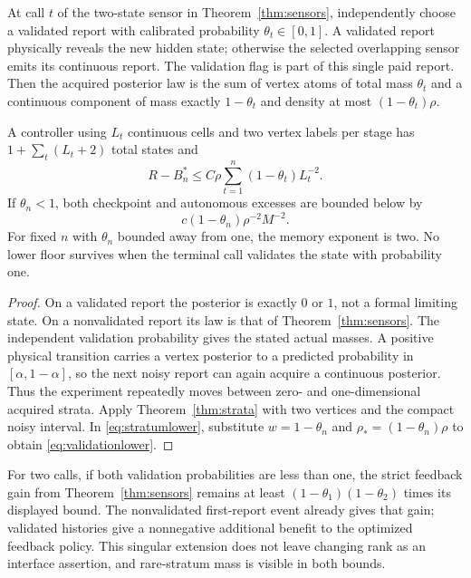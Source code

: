 \begin{corollary}\label{cor:validation}
At call $t$ of the two-state sensor in Theorem~\ref{thm:sensors}, independently choose a validated report with calibrated probability $\theta_t\in[0,1]$. A validated report physically reveals the new hidden state; otherwise the selected overlapping sensor emits its continuous report. The validation flag is part of this single paid report. Then the acquired posterior law is the sum of vertex atoms of total mass $\theta_t$ and a continuous component of mass exactly $1-\theta_t$ and density at most $(1-\theta_t)\rho$.

A controller using $L_t$ continuous cells and two vertex labels per stage has $1+\sum_t(L_t+2)$ total states and
\begin{equation}\label{eq:validationupper}
 R-B_n^*\le C\rho\sum_{t=1}^n(1-\theta_t)L_t^{-2}.
\end{equation}
If $\theta_n<1$, both checkpoint and autonomous excesses are bounded below by
\begin{equation}\label{eq:validationlower}
 c(1-\theta_n)\rho^{-2}M^{-2}.
\end{equation}
For fixed $n$ with $\theta_n$ bounded away from one, the memory exponent is two. No lower floor survives when the terminal call validates the state with probability one.
\end{corollary}
\begin{proof}
On a validated report the posterior is exactly $0$ or $1$, not a formal limiting state. On a nonvalidated report its law is that of Theorem~\ref{thm:sensors}. The independent validation probability gives the stated actual masses. A positive physical transition carries a vertex posterior to a predicted probability in $[\alpha,1-\alpha]$, so the next noisy report can again acquire a continuous posterior. Thus the experiment repeatedly moves between zero- and one-dimensional acquired strata. Apply Theorem~\ref{thm:strata} with two vertices and the compact noisy interval. In \eqref{eq:stratumlower}, substitute $w=1-\theta_n$ and $\rho_*=(1-\theta_n)\rho$ to obtain \eqref{eq:validationlower}.
\end{proof}
For two calls, if both validation probabilities are less than one, the strict feedback gain from Theorem~\ref{thm:sensors} remains at least $(1-\theta_1)(1-\theta_2)$ times its displayed bound. The nonvalidated first-report event already gives that gain; validated histories give a nonnegative additional benefit to the optimized feedback policy. This singular extension does not leave changing rank as an interface assertion, and rare-stratum mass is visible in both bounds.
